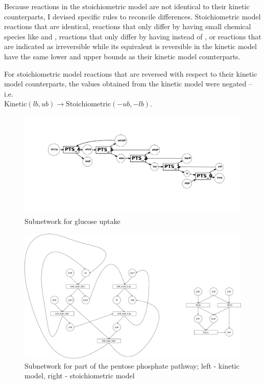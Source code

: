 \documentclass[parskip=full, numbers=noenddot]{scrreprt}
\begin{document}
Because reactions in the stoichiometric model are not identical to their kinetic counterparts, I devised specific rules to reconcile differences. Stoichiometric model reactions that are identical, reactions that only differ by having small chemical species like  and , reactions that only differ by having  instead of , or reactions that are indicated as irreversible while its equivalent is reversible in the kinetic model have the same lower and upper bounds as their kinetic model counterparts.

For stoichiometric model reactions that are reversed with respect to their kinetic model counterparts, the values obtained from the kinetic model were negated -- i.e.\\ $ \mathrm{Kinetic } (lb, ub) \rightarrow \mathrm{Stoichiometric } (-ub, -lb)$. %

\begin{figure}[p]
  \centering
  \includegraphics[scale=0.4]{glucoseuptake}
  \caption{Subnetwork for glucose uptake}
  \label{fig:glucoseuptake}
\end{figure}

\begin{figure}[p]
  \centering
  \includegraphics[scale=0.25]{ppp}
  \caption{Subnetwork for part of the pentose phosphate pathway; left - kinetic model, right - stoichiometric model}
  \label{fig:ppp}
\end{figure}
\end{document}
